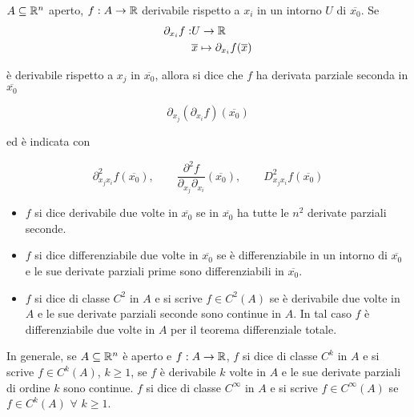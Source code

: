 \begin{definition}
	$A \subseteq \mathbb{R}^n$ aperto, $f: A \rightarrow \mathbb{R}$ derivabile rispetto a $x_i$ in un intorno $U$ di $\overline{x_0}$. Se 
	\begin{align*} 
		\partial_{x_i}f: &U\rightarrow \mathbb{R}
		\\
		&\overline{x} \mapsto \partial_{x_i}f(\overline{x})
	\end{align*}
	
	è derivabile rispetto a $x_j$ in $\overline{x_0}$, allora si dice che $f$ ha derivata parziale seconda in $\overline{x_0}$
	
	$$\partial_{x_j}(\partial_{x_i}f)(\overline{x_0})$$
	
	ed è indicata con 
	
	$$\partial_{x_jx_i}^2f(\overline{x_0}), \qquad \frac{\partial^2 f}{\partial_{x_j}\partial_{x_i}}(\overline{x_0}), \qquad D_{x_jx_i}^2f(\overline{x_0})$$
	
	\begin{itemize}
		\item $f$ si dice derivabile due volte in $\overline{x_0} $ se in $\overline{x_0}$ ha tutte le $n^2$ derivate parziali seconde.
		
		\item $f$ si dice differenziabile due volte in $\overline{x_0}$ se è differenziabile in un intorno di $\overline{x_0}$ e le sue derivate parziali prime sono differenziabili in $\overline{x_0}$.
		
		\item $f$ si dice di classe $C^2$ in $A$ e si scrive $f \in C^2(A)$ se è derivabile due volte in $A$ e le sue derivate parziali seconde sono continue in $A$. In tal caso $f$ è differenziabile due volte in $A$ per il teorema differenziale totale. 
	\end{itemize}
\end{definition}


\begin{definition}
	In generale, se $A \subseteq \mathbb{R}^n$ è aperto e $f:A\rightarrow\mathbb{R}$, $f$ si dice di classe $C^k$ in $A$ e si scrive $f \in C^k(A)$, $k \geq 1$, se $f$ è derivabile $k$ volte in $A$ e le sue derivate parziali di ordine $k$ sono continue. $f$ si dice di classe $C^\infty$ in $A$ e si scrive $f \in C^\infty(A)$ se $f\in C^k(A) \,\, \forall \,\, k \geq 1$.
\end{definition}

